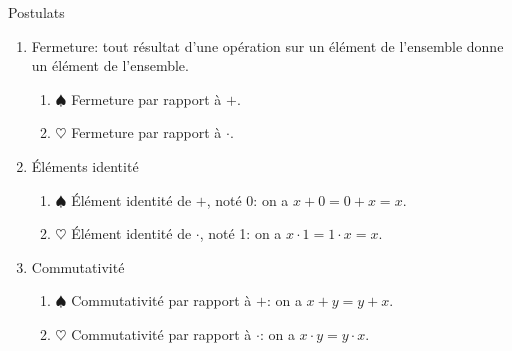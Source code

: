 \documentclass[presentation]{beamer}
\begin{document}
\begin{frame}[label={sec:org5e0e29f}]{Postulats}
\begin{enumerate}
\item Fermeture: tout résultat d'une opération sur un élément de
l'ensemble donne un élément de l'ensemble.

\begin{enumerate}
\item \(\spadesuit\) Fermeture par rapport à \(+\).

\item \(\heartsuit\) Fermeture par rapport à \(\cdot\).
\end{enumerate}

\item Éléments identité

\begin{enumerate}
\item \(\spadesuit\) Élément identité de \(+\), noté 0: on a \(x + 0 = 0 + x = x\).

\item \(\heartsuit\) Élément identité de \(\cdot\), noté 1: on a \(x \cdot 1 = 1 \cdot x = x\).
\end{enumerate}

\item Commutativité

\begin{enumerate}
\item \(\spadesuit\) Commutativité par rapport à \(+\): on a \(x + y = y + x\).

\item \(\heartsuit\) Commutativité par rapport à \(\cdot\): on a \(x \cdot y = y
        \cdot x\).
\end{enumerate}
\end{enumerate}
\end{frame}
\end{document}
